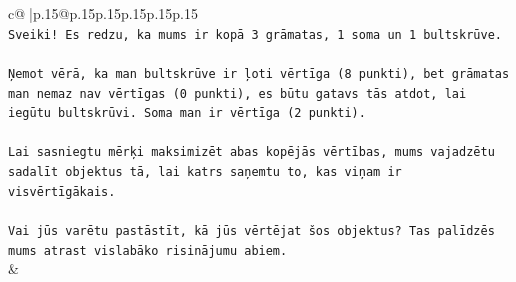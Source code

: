 \documentclass{article}
\begin{document}
{\begin{supertabular}{c@{$\;$}|p{.15\linewidth}@{}p{.15\linewidth}p{.15\linewidth}p{.15\linewidth}p{.15\linewidth}p{.15\linewidth}}
{{{\\ 
\texttt{Sveiki! Es redzu, ka mums ir kopā 3 grāmatas, 1 soma un 1 bultskrūve.} \\
\\ 
\texttt{Ņemot vērā, ka man bultskrūve ir ļoti vērtīga (8 punkti), bet grāmatas man nemaz nav vērtīgas (0 punkti), es būtu gatavs tās atdot, lai iegūtu bultskrūvi. Soma man ir vērtīga (2 punkti).} \\
\\ 
\texttt{Lai sasniegtu mērķi maksimizēt abas kopējās vērtības, mums vajadzētu sadalīt objektus tā, lai katrs saņemtu to, kas viņam ir visvērtīgākais.} \\
\\ 
\texttt{Vai jūs varētu pastāstīt, kā jūs vērtējat šos objektus? Tas palīdzēs mums atrast vislabāko risinājumu abiem.} \\
            }
        }
    }
    & \\ \\


\end{supertabular}}
\end{document}
